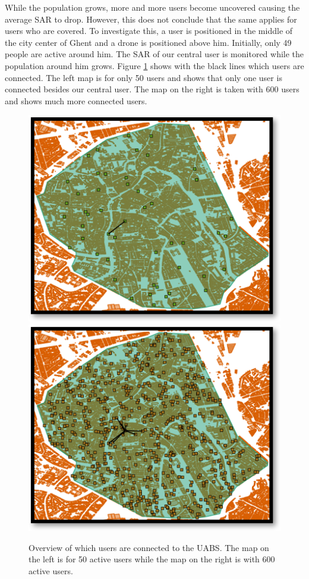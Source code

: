 While the population grows, more and more users become uncovered causing the average SAR to drop. However, this does not conclude that the same applies for 
users who are covered. To investigate this, a user is positioned in the middle of the city center of Ghent and a drone is positioned above him. Initially, only 
49 people are active around him. The \gls{SAR} of our central user is monitored while the population around him grows.
Figure \ref{fig:connectionMap} shows with the black lines which users are connected. The left map is for only 50 users and 
shows that only one user is connected besides our central user. The map on the right is taken with 600 users and shows much more connected users.

\begin{figure}[!htb]
  \includegraphics[width=\linewidth]{../images/connectionsMap50Users.png}
\endminipage\hfill
{}%
  \includegraphics[width=\linewidth]{../images/connectionsMap600Users.png}
\endminipage
  \caption{Overview of which users are connected to the \gls{UABS}. The map on the left is for 50 active users while the map on the right is with 600 active users.}
  \label{fig:connectionMap}
\end{figure}


